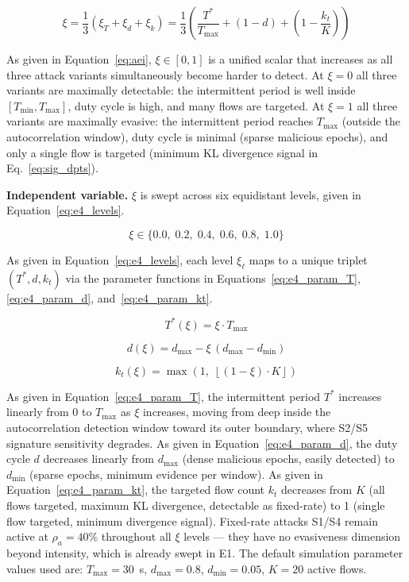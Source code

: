 \documentclass[12pt, a4paper]{report}
\newcommand{\mypar}{\vspace{0.8em}\noindent}
\begin{document}
\begin{equation}
\label{eq:aei}
\xi =
\frac{1}{3}\!\left(
\xi_T + \xi_d + \xi_k
\right)
=
\frac{1}{3}\!\left(
\frac{T^*}{T_{\max}}
+ (1 - d)
+ \left(1 - \frac{k_t}{K}\right)
\right)
\end{equation}

As given in Equation~\eqref{eq:aei}, $\xi \in [0,1]$ is a unified
scalar that increases as all three attack variants simultaneously
become harder to detect. At $\xi = 0$ all three variants are
maximally detectable: the intermittent period is well inside
$[T_{\min}, T_{\max}]$, duty cycle is high, and many flows are
targeted. At $\xi = 1$ all three variants are maximally evasive:
the intermittent period reaches $T_{\max}$ (outside the
autocorrelation window), duty cycle is minimal (sparse malicious
epochs), and only a single flow is targeted (minimum KL divergence
signal in Eq.~\eqref{eq:sig_dpts}).

\mypar
\textbf{Independent variable.}
$\xi$ is swept across six equidistant levels, given in
Equation~\eqref{eq:e4_levels}.

\begin{equation}
\label{eq:e4_levels}
\xi \in \{0.0,\; 0.2,\; 0.4,\; 0.6,\; 0.8,\; 1.0\}
\end{equation}

As given in Equation~\eqref{eq:e4_levels}, each level $\xi_\ell$
maps to a unique triplet $(T^*, d, k_t)$ via the parameter functions
in Equations~\eqref{eq:e4_param_T}, \eqref{eq:e4_param_d},
and~\eqref{eq:e4_param_kt}.

\begin{equation}
\label{eq:e4_param_T}
T^*(\xi) = \xi \cdot T_{\max}
\end{equation}

\begin{equation}
\label{eq:e4_param_d}
d(\xi) = d_{\max} - \xi\,(d_{\max} - d_{\min})
\end{equation}

\begin{equation}
\label{eq:e4_param_kt}
k_t(\xi) =
\max\!\left(1,\;
\left\lfloor (1 - \xi) \cdot K \right\rfloor
\right)
\end{equation}

As given in Equation~\eqref{eq:e4_param_T}, the intermittent
period $T^*$ increases linearly from $0$ to $T_{\max}$ as $\xi$
increases, moving from deep inside the autocorrelation detection
window toward its outer boundary, where S2/S5 signature sensitivity
degrades. As given in Equation~\eqref{eq:e4_param_d}, the duty
cycle $d$ decreases linearly from $d_{\max}$ (dense malicious epochs,
easily detected) to $d_{\min}$ (sparse epochs, minimum evidence per
window). As given in Equation~\eqref{eq:e4_param_kt}, the targeted
flow count $k_t$ decreases from $K$ (all flows targeted,
maximum KL divergence, detectable as fixed-rate) to 1 (single flow
targeted, minimum divergence signal). Fixed-rate attacks S1/S4 remain
active at $\rho_a = 40\%$ throughout all $\xi$ levels — they have no
evasiveness dimension beyond intensity, which is already swept in E1.
The default simulation parameter values used are:
$T_{\max} = 30$~s, $d_{\max} = 0.8$, $d_{\min} = 0.05$,
$K = 20$ active flows.
\end{document}
